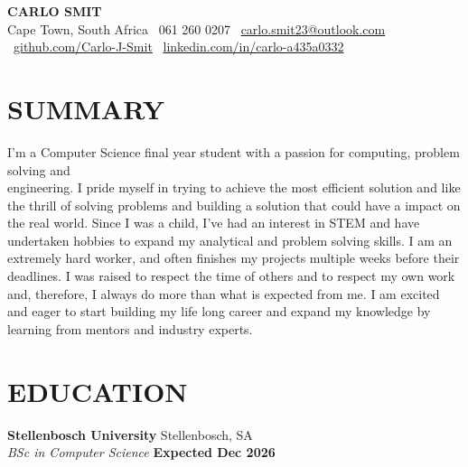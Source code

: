 \documentclass[11pt,a4paper]{article}
\begin{document}
\pagestyle{empty}
\color{TextDark}

\begin{center}
    {\Huge \textbf{CARLO SMIT}} \\
    \vspace{6pt}
    \small
    \faMapMarker* Cape Town, South Africa \quad 
    \faPhone \ 061 260 0207 \quad 
    \faEnvelope \
	\href{mailto:carlo.smit23@outlook.com}{carlo.smit23@outlook.com} \\
    \vspace{2pt}
    \faGithub \ \href{https://github.com/Carlo-J-Smit}{github.com/Carlo-J-Smit} \quad 
    \faLinkedin \
	\href{https://www.linkedin.com/in/carlo-smit-a435a0332/}{linkedin.com/in/carlo-a435a0332}
\end{center}

\section{SUMMARY}
I'm a Computer Science final year student with a passion for
computing, problem solving and \\ engineering. I pride myself in trying to achieve
the most efficient solution and like the thrill of solving problems and
building a solution that could have a impact on the real world. Since I was a child,
I've had an interest in STEM and have undertaken hobbies to expand my analytical
and problem solving skills. I am an extremely hard worker, and often finishes my
projects multiple weeks before their deadlines. I was raised to respect the time
of others and to respect my own work and, therefore, I always do more than what is
expected from me. I am excited and eager to start building my life long career
and expand my knowledge by learning from mentors and industry experts.

\section{EDUCATION}
\textbf{Stellenbosch University} \hfill Stellenbosch, SA \\
\textit{BSc in Computer Science} \hfill \textbf{Expected Dec 2026}

	\vspace{5pt}
\end{document}
